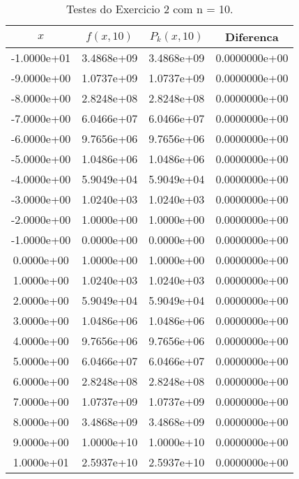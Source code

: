
    \begin{table}[H]
    \centering
    \caption{Testes do Exercicio 2 com n = 10.}
    \label{tab:exercicio_2_resultados}
    \begin{tabular}{|c|c|c|c|}
    \toprule
    \textbf{$x$} & \textbf{$f(x,10)$} & \textbf{$P_k(x,10)$} & \textbf{Diferenca} \\
    \midrule   
    -1.0000e+01 & 3.4868e+09 & 3.4868e+09 & 0.0000000e+00 \\
                            -9.0000e+00 & 1.0737e+09 & 1.0737e+09 & 0.0000000e+00 \\
                            -8.0000e+00 & 2.8248e+08 & 2.8248e+08 & 0.0000000e+00 \\
                            -7.0000e+00 & 6.0466e+07 & 6.0466e+07 & 0.0000000e+00 \\
                            -6.0000e+00 & 9.7656e+06 & 9.7656e+06 & 0.0000000e+00 \\
                            -5.0000e+00 & 1.0486e+06 & 1.0486e+06 & 0.0000000e+00 \\
                            -4.0000e+00 & 5.9049e+04 & 5.9049e+04 & 0.0000000e+00 \\
                            -3.0000e+00 & 1.0240e+03 & 1.0240e+03 & 0.0000000e+00 \\
                            -2.0000e+00 & 1.0000e+00 & 1.0000e+00 & 0.0000000e+00 \\
                            -1.0000e+00 & 0.0000e+00 & 0.0000e+00 & 0.0000000e+00 \\
                            0.0000e+00 & 1.0000e+00 & 1.0000e+00 & 0.0000000e+00 \\
                            1.0000e+00 & 1.0240e+03 & 1.0240e+03 & 0.0000000e+00 \\
                            2.0000e+00 & 5.9049e+04 & 5.9049e+04 & 0.0000000e+00 \\
                            3.0000e+00 & 1.0486e+06 & 1.0486e+06 & 0.0000000e+00 \\
                            4.0000e+00 & 9.7656e+06 & 9.7656e+06 & 0.0000000e+00 \\
                            5.0000e+00 & 6.0466e+07 & 6.0466e+07 & 0.0000000e+00 \\
                            6.0000e+00 & 2.8248e+08 & 2.8248e+08 & 0.0000000e+00 \\
                            7.0000e+00 & 1.0737e+09 & 1.0737e+09 & 0.0000000e+00 \\
                            8.0000e+00 & 3.4868e+09 & 3.4868e+09 & 0.0000000e+00 \\
                            9.0000e+00 & 1.0000e+10 & 1.0000e+10 & 0.0000000e+00 \\
                            1.0000e+01 & 2.5937e+10 & 2.5937e+10 & 0.0000000e+00 \\
                            
    \bottomrule
    \end{tabular}
    \end{table}    
    